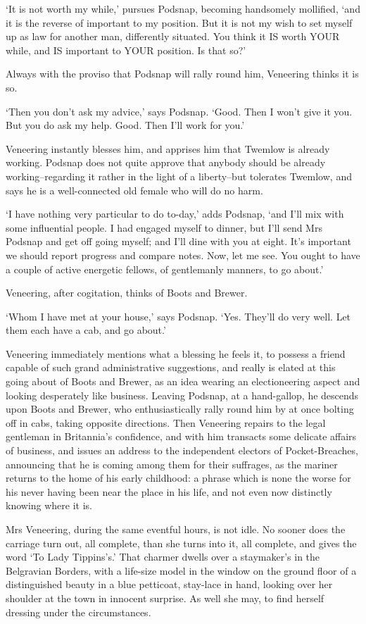 ‘It is not worth my while,’ pursues Podsnap, becoming handsomely
mollified, ‘and it is the reverse of important to my position. But it
is not my wish to set myself up as law for another man, differently
situated. You think it IS worth YOUR while, and IS important to YOUR
position. Is that so?’

Always with the proviso that Podsnap will rally round him, Veneering
thinks it is so.

‘Then you don’t ask my advice,’ says Podsnap. ‘Good. Then I won’t give
it you. But you do ask my help. Good. Then I’ll work for you.’

Veneering instantly blesses him, and apprises him that Twemlow is
already working. Podsnap does not quite approve that anybody should
be already working--regarding it rather in the light of a liberty--but
tolerates Twemlow, and says he is a well-connected old female who will
do no harm.

‘I have nothing very particular to do to-day,’ adds Podsnap, ‘and I’ll
mix with some influential people. I had engaged myself to dinner, but
I’ll send Mrs Podsnap and get off going myself; and I’ll dine with you
at eight. It’s important we should report progress and compare notes.
Now, let me see. You ought to have a couple of active energetic fellows,
of gentlemanly manners, to go about.’

Veneering, after cogitation, thinks of Boots and Brewer.

‘Whom I have met at your house,’ says Podsnap. ‘Yes. They’ll do very
well. Let them each have a cab, and go about.’

Veneering immediately mentions what a blessing he feels it, to possess
a friend capable of such grand administrative suggestions, and really
is elated at this going about of Boots and Brewer, as an idea wearing
an electioneering aspect and looking desperately like business. Leaving
Podsnap, at a hand-gallop, he descends upon Boots and Brewer, who
enthusiastically rally round him by at once bolting off in cabs, taking
opposite directions. Then Veneering repairs to the legal gentleman in
Britannia’s confidence, and with him transacts some delicate affairs
of business, and issues an address to the independent electors of
Pocket-Breaches, announcing that he is coming among them for their
suffrages, as the mariner returns to the home of his early childhood: a
phrase which is none the worse for his never having been near the place
in his life, and not even now distinctly knowing where it is.

Mrs Veneering, during the same eventful hours, is not idle. No sooner
does the carriage turn out, all complete, than she turns into it, all
complete, and gives the word ‘To Lady Tippins’s.’ That charmer dwells
over a staymaker’s in the Belgravian Borders, with a life-size model
in the window on the ground floor of a distinguished beauty in a blue
petticoat, stay-lace in hand, looking over her shoulder at the town in
innocent surprise. As well she may, to find herself dressing under the
circumstances.

